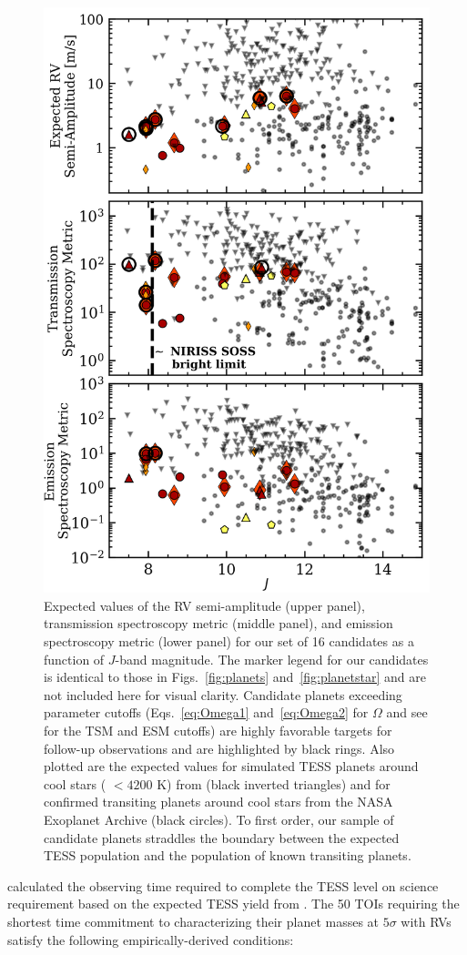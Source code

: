 \begin{figure}
  \centering
  \includegraphics[width=0.6\hsize]{figures/planetsample_followup.png}
  \caption[Follow-up diagnostics for the \texttt{ORION} planet candidate sample.]
      {Expected values of the RV semi-amplitude (upper panel), transmission spectroscopy metric (middle panel),
    and emission spectroscopy metric (lower panel) for our set of 16 candidates as a function of $J$-band
    magnitude. The marker legend for our candidates is identical to those in Figs.~\ref{fig:planets}
    and~\ref{fig:planetstar} and are not included here for visual clarity. Candidate planets
    exceeding parameter cutoffs (Eqs.~\ref{eq:Omega1} and~\ref{eq:Omega2} for $\Omega$ and see \citealt{kempton18} for
    the TSM and ESM cutoffs) are highly favorable targets for follow-up observations and are highlighted by black rings.
    Also plotted are the expected values for simulated TESS planets around cool stars (\teff{} $< 4200$ K) from
    \cite{barclay18} (black inverted triangles) and for confirmed transiting planets around cool stars from the NASA
    Exoplanet Archive (black circles). To first order, our sample of candidate planets straddles the boundary
    between the expected TESS population and the population of known transiting planets.}
  \label{fig:followup}
\end{figure}

\cite{cloutier18b} calculated the observing time required to complete the TESS level on science requirement
based on the expected TESS yield from \cite{sullivan15}. The 50 TOIs requiring the shortest time
commitment to characterizing their planet masses at $5\sigma$ with RVs satisfy the following empirically-derived
conditions: 


